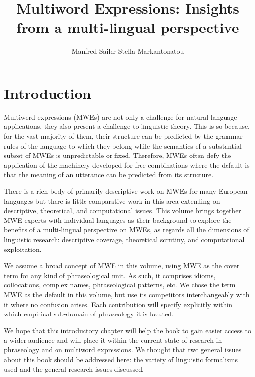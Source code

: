 \documentclass[output=paper]{langsci/langscibook}
\author{Manfred Sailer\affiliation{%
Goethe University Frankfurt/Main}%
\lastand Stella Markantonatou\affiliation{Institute for Language and Speech Processing, Athena RIC, Greece}}
\title{Multiword Expressions: Insights from a multi-lingual perspective}
\begin{document}
\section{Introduction}\label{Sec-Introduction} 
Multiword expressions (MWEs)  are not only a challenge for natural language applications, they also present a challenge to linguistic theory. This is so because, for the vast majority of them, their structure can be predicted by the grammar rules of the language to which they belong while the semantics of a substantial subset of MWEs is unpredictable or fixed. 
Therefore, MWEs often defy the application of the machinery developed for free combinations where the default is that the meaning of an utterance can be predicted from its structure.



There is a rich body of primarily descriptive work on MWEs for many European languages but there is little comparative work in this area extending on descriptive, theoretical, and computational issues. 
%
This volume brings together MWE experts with individual languages as their background to explore the benefits of a multi-lingual perspective on MWEs, as regards all the dimensions of linguistic research: descriptive coverage, theoretical scrutiny, and computational exploitation. 

We assume a broad concept of MWE in this volume, using MWE as the cover term for any kind of phraseological unit.  As such, it comprises idioms, collocations, complex names, phraseological patterns, etc. We chose the term MWE as the default in this volume, but use its competitors interchangeably with it where no confusion arises. Each contribution will specify explicitly within which empirical sub-domain of phraseology it is located.

We hope that this introductory chapter will help the book to gain easier access to a wider audience and will place it within the current state of research in phraseology and on multiword expressions. We thought that two general issues about this book should be addressed here: the variety of linguistic formalisms used and the general research issues discussed. 
\end{document}
